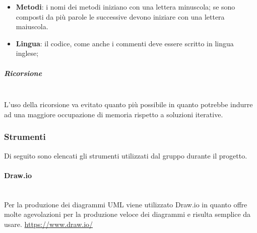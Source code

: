\begin{itemize}
\begin{itemize}
	\item \textbf{Metodi}: i nomi dei metodi iniziano con una lettera minuscola;
	se sono composti da più parole le successive devono iniziare con una lettera
	maiuscola.
	\item \textbf{Lingua}: il codice, come anche i commenti deve essere scritto in lingua inglese;
\end{itemize}
\subparagraph{Ricorsione} \mbox{}\\
L'uso della ricorsione va evitato quanto più possibile in  quanto  potrebbe
indurre  ad  una  maggiore  occupazione  di  memoria  rispetto  a  soluzioni
iterative.
\subsubsection{Strumenti}
Di seguito sono elencati gli strumenti utilizzati dal gruppo durante il progetto.
\paragraph{Draw.io} \mbox{}\\
Per la produzione dei diagrammi UML viene utilizzato Draw.io in quanto offre molte agevolazioni per la produzione veloce dei diagrammi e risulta semplice da usare.
\url{https://www.draw.io/}

\end{itemize}
